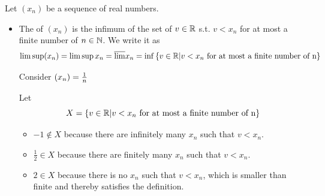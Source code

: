 \documentclass[a4paper,12pt]{article}
\begin{document}
\begin{definition}
    Let \((x_n)\) be a sequence of real numbers.
    \begin{itemize}
        \item The  of \((x_n)\) is the infimum of the set of \(v\in\mathbb{R}\) s.t. \(v< x_n\) for at most a finite number of \(n\in\mathbb{N}\). We write it as
        \[\limsup(x_n) = \limsup x_n = \overline{\lim}x_n = \inf{\{v\in\mathbb{R}|v<x_n \text{ for at most a finite number of n}\}}\]
        \begin{example}
            Consider \((x_{n})=\frac{1}{n}\)
            \begin{center}
            \end{center}

            Let\[X=\{v\in\mathbb{R}|v<x_n \text{ for at most a finite number of n}\}\]
            \begin{itemize}
                \item \(-1\notin X\) because there are infinitely many \(x_n\) such that \(v<x_n\).
                \item \(\frac{1}{2}\in X\) because there are finitely many \(x_n\) such that \(v<x_n\).
                \item \(2\in X\) because there is no \(x_n\) such that \(v<x_n\), which is smaller than finite and thereby satisfies the definition.
            \end{itemize}


\end{example}
\end{itemize}
\end{definition}
\end{document}
